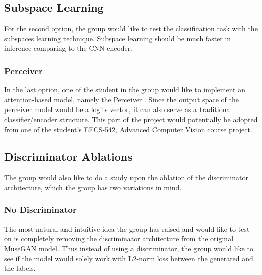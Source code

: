 \begin{par}
        \subsection{Subspace Learning} %
        \label{ssub:Subspace Learning}
            \par For the second option, the group would like to test the classification task with the subspaces learning technique. Subspace learning should be much faster in inference comparing to the CNN encoder. 

        \subsubsection{Perceiver} %
        \label{ssub:Perceiver}
            \par In the last option, one of the student in the group would like to implement an attention-based model, namely the Perceiver \cite{perceiver}. Since the output space of the perceiver model would be a logits vector, it can also serve as a traditional classifier/encoder structure. This part of the project would potentially be adopted from one of the student's EECS-542, Advanced Computer Vision course project. 

    \subsection{Discriminator Ablations} %
    \label{sub:Discriminator Ablations}
        \par The group would also like to do a study upon the ablation of the discriminator architecture, which the group has two variations in mind. 

        \subsubsection{No Discriminator} %
        \label{ssub:No Discriminator}
            \par The most natural and intuitive idea the group has raised and would like to test on is completely removing the discriminator architecture from the original MuseGAN model.  Thus instead of using a discriminator, the group would like to see if the model would solely work with L2-norm loss between the generated and the labels.


\end{par}
